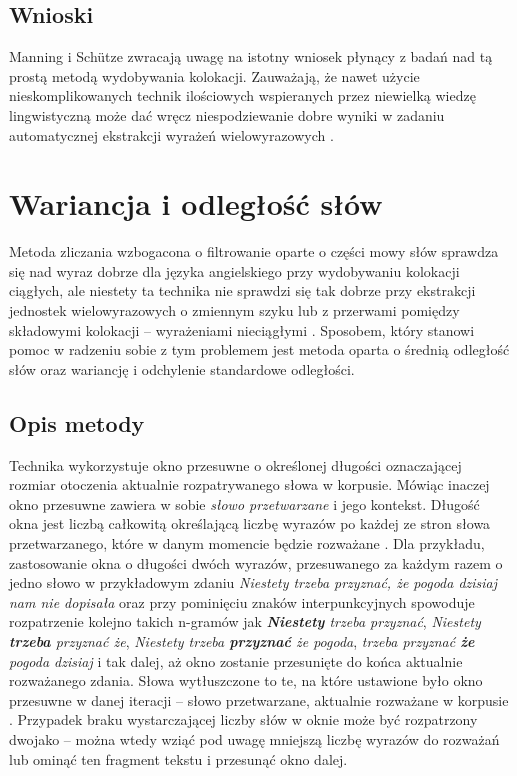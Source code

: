 \subsection{Wnioski}
Manning i Schütze zwracają uwagę na istotny wniosek płynący z badań nad tą prostą metodą wydobywania kolokacji.
Zauważają, że nawet użycie nieskomplikowanych technik ilościowych wspieranych przez niewielką wiedzę lingwistyczną może dać wręcz niespodziewanie dobre wyniki w zadaniu automatycznej ekstrakcji wyrażeń wielowyrazowych \cite[str. 155, 157]{mit}.



\section{Wariancja i odległość słów}

Metoda zliczania wzbogacona o filtrowanie oparte o części mowy słów sprawdza się nad wyraz dobrze dla języka angielskiego przy wydobywaniu kolokacji ciągłych, ale niestety ta technika nie sprawdzi się tak dobrze przy ekstrakcji jednostek wielowyrazowych o zmiennym szyku lub z przerwami pomiędzy składowymi kolokacji -- wyrażeniami nieciągłymi \cite[str. 157]{mit}.
Sposobem, który stanowi pomoc w radzeniu sobie z tym problemem jest metoda oparta o średnią odległość słów oraz wariancję i odchylenie standardowe odległości.

\subsection{Opis metody}
Technika wykorzystuje okno przesuwne o określonej długości oznaczającej rozmiar otoczenia aktualnie rozpatrywanego słowa w korpusie.
Mówiąc inaczej okno przesuwne zawiera w sobie \emph{słowo przetwarzane} i jego kontekst.
Długość okna jest liczbą całkowitą określającą liczbę wyrazów po każdej ze stron słowa przetwarzanego, które w danym momencie będzie rozważane \cite[str. 158]{mit}.
Dla przykładu, zastosowanie okna o długości dwóch wyrazów, przesuwanego za każdym razem o jedno słowo w przykładowym zdaniu \emph{Niestety trzeba przyznać, że pogoda dzisiaj nam nie dopisała} oraz przy pominięciu znaków interpunkcyjnych spowoduje rozpatrzenie kolejno takich n-gramów jak \textit{\textbf{Niestety} trzeba przyznać}, \textit{Niestety \textbf{trzeba} przyznać że}, \textit{Niestety trzeba \textbf{przyznać} że pogoda}, \textit{trzeba przyznać \textbf{że} pogoda dzisiaj} i tak dalej, aż okno zostanie przesunięte do końca aktualnie rozważanego zdania.
Słowa wytłuszczone to te, na które ustawione było okno przesuwne w danej iteracji -- słowo przetwarzane, aktualnie rozważane w korpusie \cite[str. 158]{mit}.
Przypadek braku wystarczającej liczby słów w oknie może być rozpatrzony dwojako -- można wtedy wziąć pod uwagę mniejszą liczbę wyrazów do rozważań lub ominąć ten fragment tekstu i przesunąć okno dalej.

